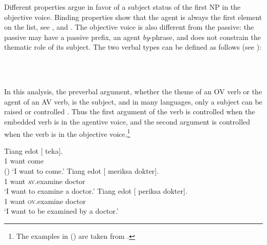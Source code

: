 Different properties argue in favor of a subject status of the first NP in the objective
voice. Binding properties show that the agent is always the first element on the \argst list, see
,  and . The objective
voice is also different from the passive: the passive may have a passive prefix, an agent
\emph{by}-phrase, and does not constrain the thematic role of its subject. The two verbal types can
be defined as follows (see ):

\eal
\ex 
{} \impl\\
\ex 
{} \impl\\
\zl

In this analysis, the preverbal argument, whether the theme of an OV verb or the agent of an AV
verb, is the subject, and in many languages, only a subject can be raised or controlled
\citep{Zaenenetal1985}. Thus the first argument of the verb is controlled when the embedded verb is
in the agentive voice, and the second argument is controlled when the verb is in the objective
voice.\footnote{%
  The examples in () are taken from .
}


\begin{exe}
\ex \begin{xlist}
\ex 
\gll Tiang edot [ \trace{} teka].\\
     1 want     {} {} come\\\hfill()
\glt `I want to come.'
\ex 
\gll Tiang edot [ \trace{}  meriksa dokter].\\
     1     want {} {}     \textsc{av}.examine doctor\\
\glt `I want to examine a doctor.'
\ex 
\gll Tiang edot [ \trace{} periksa dokter].\\
     1     want {} {}    \textsc{ov}.examine doctor\\
\glt `I want to be examined by a doctor.'
\end{xlist}
\end{exe}

